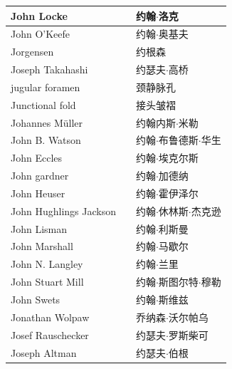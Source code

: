 \begin{longtable}{lll}
	\midrule
	John Locke   && 约翰$\cdot$洛克  \\
	
	\midrule
	John O’Keefe   && 约翰$\cdot$奥基夫  \\
	
	\midrule
	Jorgensen   && 约根森  \\
	
	\midrule
	Joseph Takahashi   && 约瑟夫$\cdot$高桥  \\
	
	\midrule
	jugular foramen   && 颈静脉孔  \\
	
	\midrule
	Junctional fold   && 接头皱褶  \\
	
	\midrule
	Johannes Müller   && 约翰内斯$\cdot$米勒  \\
	
	\midrule
	John B. Watson   && 约翰$\cdot$布鲁德斯$\cdot$华生  \\
	
	\midrule
	John Eccles   && 约翰$\cdot$埃克尔斯  \\
	
	\midrule
	John gardner   && 约翰$\cdot$加德纳  \\
	
	\midrule
	John Heuser   && 约翰$\cdot$霍伊泽尔  \\
	
	\midrule
	John Hughlings Jackson   && 约翰$\cdot$休林斯$\cdot$杰克逊  \\
	
	\midrule
	John Lisman   && 约翰$\cdot$利斯曼  \\
	
	\midrule
	John Marshall   && 约翰$\cdot$马歇尔  \\
	
	\midrule
	John N. Langley   && 约翰$\cdot$兰里  \\
	
	\midrule
	John Stuart Mill   && 约翰$\cdot$斯图尔特$\cdot$穆勒  \\
	
	\midrule
	John Swets   && 约翰$\cdot$斯维兹  \\
	
	\midrule
	Jonathan Wolpaw   && 乔纳森$\cdot$沃尔帕乌  \\
	
	\midrule
	Josef Rauschecker   && 约瑟夫$\cdot$罗斯柴可  \\
	
	\midrule
	Joseph Altman   && 约瑟夫$\cdot$伯根  \\
	

\end{longtable}
